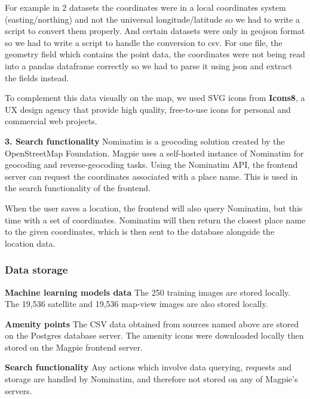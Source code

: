 For example in 2 datasets the coordinates were in a local coordinates system
(easting/northing) and not the universal longitude/latitude so we had to write a
script to convert them properly. And certain datasets were only in geojson
format so we had to write a script to handle the conversion to csv. For one
file, the geometry field which contains the point data, the coordinates were not
being read into a pandas dataframe correctly so we had to parse it using json
and extract the fields instead.

To complement this data visually on the map, we used SVG icons from
\textbf{Icons8}, a UX design agency that provide high quality, free-to-use icons
for personal and commercial web projects.

\textbf{3. Search functionality}
Nominatim is a geocoding solution created by the OpenStreetMap Foundation.
Magpie uses a self-hosted instance of Nominatim for geocoding and
reverse-geocoding tasks. Using the Nominatim API, the frontend server can
request the coordinates associated with a place name. This is used in the search
functionality of the frontend.

When the user saves a location, the frontend will also query Nominatim, but this
time with a set of coordinates. Nominatim will then return the closest place
name to the given coordinates, which is then sent to the database alongside the
location data.

\subsubsection{Data storage}
\textbf{Machine learning models data}
The 250 training images are stored locally.
The 19,536 satellite and 19,536 map-view images are also stored locally.

\textbf{Amenity points}
The CSV data obtained from sources named above are stored on the Postgres database server.
The amenity icons were downloaded locally then stored on the Magpie frontend server.

\textbf{Search functionality}
Any actions which involve data querying, requests and storage are handled by
Nominatim, and therefore not stored on any of Magpie's servers.

\newpage{}